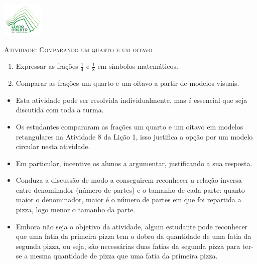 \documentclass[10 pt,usenames,dvipsnames, oneside]{article}
\begin{document}
\begin{center}
  \begin{minipage}[l]{3cm}
\includegraphics[width=2cm]{logo}    
\end{minipage}\hfill
\begin{minipage}[r]{.8\textwidth}
 {\Large \scshape Atividade: Comparando um quarto e um oitavo}  
\end{minipage}
\end{center}
\vspace{.2cm}

\ifdefined\prof
\begin{goals}
\begin{enumerate}

  \item Expressar as frações $\frac{1}{4}$ e $\frac{1}{8}$ em símbolos matemáticos.
  \item Comparar as frações um quarto e um oitavo a partir de modelos visuais.

\end{enumerate}
\tcblower

\begin{itemize} %
    \item Esta atividade pode ser resolvida individualmente, mas é essencial que seja discutida com toda a turma.
    \item Os estudantes compararam as frações um quarto e um oitavo em modelos retangulares na Atividade 8 da Lição 1, isso justifica a opção por um modelo circular nesta atividade.
    \item Em particular, incentive os alunos a argumentar, justificando a sua resposta.
    \item Conduza a discussão de modo a conseguirem reconhecer a relação inversa entre denominador (número de partes) e o tamanho de cada parte: quanto maior o denominador, maior é o número de partes em que foi repartida a pizza, logo menor o tamanho da parte.
      \item Embora não seja o objetivo da atividade, algum estudante pode reconhecer que uma fatia da primeira pizza tem o dobro da quantidade de uma fatia da segunda  pizza, ou seja, são necessárias duas fatias da segunda pizza para ter-se a mesma quantidade de pizza que uma fatia da primeira pizza.
\end{itemize}

\end{goals}
\end{document}
